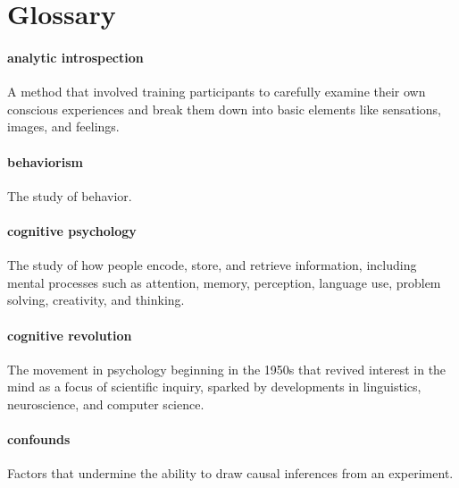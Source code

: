 \documentclass[
]{krantz}
\begin{document}
\section{Glossary}\label{glossary}

\paragraph*{analytic introspection}\label{analytic-introspection}

A method that involved training participants to carefully examine their own conscious experiences and break them down into basic elements like sensations, images, and feelings.

\paragraph*{behaviorism}\label{behaviorism}

The study of behavior.

\paragraph*{cognitive psychology}\label{cognitive-psychology}

The study of how people encode, store, and retrieve information, including mental processes such as attention, memory, perception, language use, problem solving, creativity, and thinking.

\paragraph*{cognitive revolution}\label{cognitive-revolution-1}

The movement in psychology beginning in the 1950s that revived interest in the mind as a focus of scientific inquiry, sparked by developments in linguistics, neuroscience, and computer science.

\paragraph*{confounds}\label{confounds}

Factors that undermine the ability to draw causal inferences from an experiment.
\end{document}

